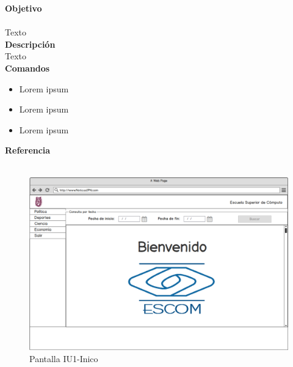 
\Large{\textbf{Objetivo}}\\\\
\normalsize{Texto}\\

	

\Large{\textbf{Descripción}}\\
\normalsize{Texto}\\

\Large{\textbf{Comandos}}\\
\normalsize{}

\begin{itemize}
	\item Lorem ipsum
	\item Lorem ipsum
	\item Lorem ipsum
\end{itemize}


\Large{\textbf{Referencia}}\\\\
\normalsize{}

\begin{figure}[h]
  \centering
	\includegraphics[scale=.35]{imagenes/Pantallas/UI1}
  \caption{Pantalla IU1-Inico}
  \label{fig:IU1}
\end{figure}



